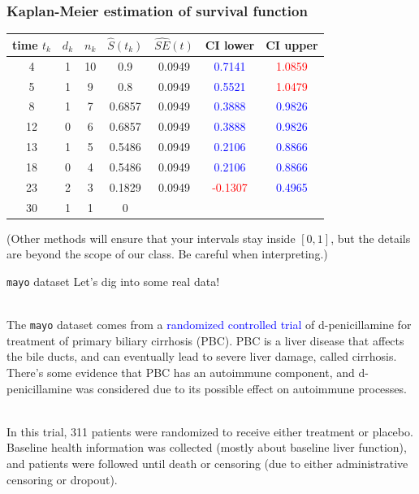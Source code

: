 \documentclass[10pt,t]{beamer}
\begin{document}
\begin{frame}
\frametitle{Kaplan-Meier estimation of survival function}

\centering
\begin{tabular}{|c|c|c|c|c|c|c|}
\hline
time $t_k$ & $d_k$ & $n_k$ & $\widehat{S}(t_k)$ & $\widehat{SE}(t)$ & CI lower & CI upper \\
\hline
4 & 1 & 10 & 0.9 & 0.0949 & \textcolor{blue}{0.7141} & \textcolor{red}{1.0859} \\
5 & 1 & 9 &  0.8 & 0.0949 & \textcolor{blue}{0.5521} & \textcolor{red}{1.0479}\\
8 & 1 & 7 & 0.6857 & 0.0949 & \textcolor{blue}{0.3888} & \textcolor{blue}{0.9826}\\
12 & 0 & 6 & 0.6857 & 0.0949 & \textcolor{blue}{0.3888} & \textcolor{blue}{0.9826}\\
13 & 1 & 5 & 0.5486 & 0.0949 & \textcolor{blue}{0.2106} & \textcolor{blue}{0.8866}\\
18 & 0 & 4 & 0.5486 & 0.0949 & \textcolor{blue}{0.2106} & \textcolor{blue}{0.8866}\\
23 & 2 & 3 & 0.1829 & 0.0949 & \textcolor{red}{-0.1307} & \textcolor{blue}{0.4965}\\
30 & 1 & 1 & 0 & & & \\
\hline
\end{tabular}

\raggedright

\vspace{0.5cm}
(Other methods will ensure that your intervals stay inside $[0,1]$, but the details are beyond the scope of our class. Be careful when interpreting.)
\end{frame}

\begin{frame}{\texttt{mayo} dataset}
	Let's dig into some real data!
	\\ ~\ 
	
	The \texttt{mayo} dataset comes from a \textcolor{blue}{randomized controlled trial} of d-penicillamine for treatment of primary biliary cirrhosis (PBC). PBC is a liver disease that affects the bile ducts, and can eventually lead to severe liver damage, called cirrhosis. There's some evidence that PBC has an autoimmune component, and d-penicillamine was considered due to its possible effect on autoimmune processes. 
	\\ ~\ 
	
	In this trial, 311 patients were randomized to receive either treatment or placebo. Baseline health information was collected (mostly about baseline liver function), and patients were followed until death or censoring (due to either administrative censoring or dropout). 
\end{frame}
\end{document}

